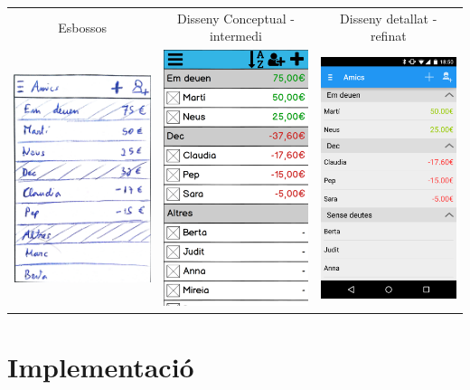 \begin{table}
\begin{tabular}{| c | c | c |}
\hline
Esbossos & Disseny Conceptual - intermedi & Disseny detallat - refinat \\
\includegraphics[width=50mm]{1_People.jpg} &
\includegraphics[width=50mm]{2_People.png} &
\includegraphics[width=50mm]{3_People.png}  \\
\hline
\end{tabular}
\end{table}


\section{Implementació}